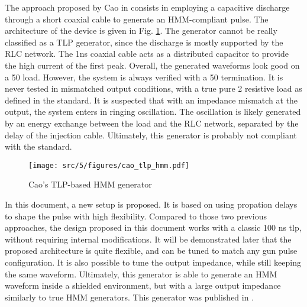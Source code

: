 The approach proposed by Cao in \cite{tlp-based-hmm} consists in employing a capacitive discharge through a short coaxial cable to generate an HMM-compliant pulse.
The architecture of the device is given in Fig. \ref{fig:cao_tlp_hmm}.
The generator cannot be really classified as a \gls{TLP} generator, since the discharge is mostly supported by the RLC network. The 1ns coaxial cable acts as a distributed capacitor to provide the high current of the first peak.
Overall, the generated waveforms look good on a 50\textOmega{} load.
However, the system is always verified with a 50\textOmegae{} termination.
It is never tested in mismatched output conditions, with a true pure 2\textOmega{} resistive load as defined in the standard.
It is suspected that with an impedance mismatch at the output, the system enters in ringing oscillation.
The oscillation is likely generated by an energy exchange between the load and the RLC network, separated by the delay of the injection cable.
Ultimately, this generator is probably not compliant with the standard.

\begin{figure}[!h]
  \centering
  \texttt{[image: src/5/figures/cao\_tlp\_hmm.pdf]}
  \caption{Cao's TLP-based HMM generator}
  \label{fig:cao_tlp_hmm}
\end{figure}

In this document, a new setup is proposed.
It is based on using propation delays to shape the pulse with high flexibility.
Compared to those two previous approaches, the design proposed in this document works with a classic 100 ns \gls{tlp}, without requiring internal modifications.
It will be demonstrated later that the proposed architecture is quite flexible, and can be tuned to match any gun pulse configuration.
It is also possible to tune the output impedance, while still keeping the same waveform.
Ultimately, this generator is able to generate an HMM waveform inside a shielded environment, but with a large output impedance similarly to true HMM generators.
This generator was published in \cite{my-publi-tlp-hmm}.
